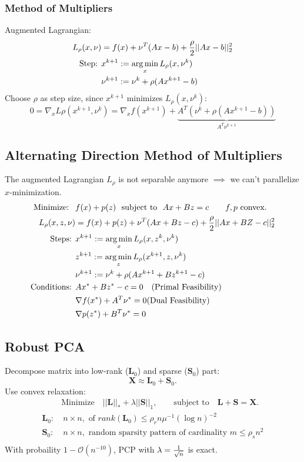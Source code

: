 \documentclass[a4paper,11pt,landscape]{article}
\newcommand{\argmin}{\operatorname*{arg\,min}}
\begin{document}
\begin{multicols}{3}
\subsubsection{Method of Multipliers}
Augmented Lagrangian:
\begin{align*}
  L_\rho (x,\nu) &= f(x) + \nu^T (Ax-b) + {\rho \over 2} ||Ax-b||_2^2\\
 \text{Step: }& x^{k+1} := \argmin_x L_\rho (x,\nu^k)\\
  &\nu^{k+1} := \nu^k +\rho (Ax^{k+1}-b)
\end{align*}
Choose $\rho$ as step size, since $x^{k+1}$ minimizes $L_\rho(x, \nu^k)$:
\[
 0 =\nabla_x L\rho(x^{k+1}, \nu^k) = \nabla_x f(x^{k+1}) + \underbrace{A^T (\nu^k +\rho(Ax^{k+1}-b))}_{A^T \nu^{k+1}}
\]

\subsection{Alternating Direction Method of Multipliers}
The augmented Lagrangian $L_\rho$ is not separable anymore $\implies$ we can't parallelize $x$-minimization.
\begin{align*}
 \text{Minimize: }\ &f(x) + p(z)\ \text{ subject to }\ Ax+Bz = c \qquad f,p \text{ convex}.\\
 L_\rho(x, z, \nu) &= f(x)+p(z)+ \nu^T (Ax+Bz-c) + {\rho \over 2}||Ax + BZ- c||_2^2\\
 \text{Steps: } & x^{k+1} := \argmin_x L_\rho (x, z^k, \nu^k)\\
  & z^{k+1} := \argmin_z L_\rho(x^{k+1}, z, \nu^k)\\
  & \nu^{k+1} := \nu^k + \rho(Ax^{k+1}+Bz^{k+1}-c)\\
 \text{Conditions: }& Ax^* + Bz^* - c = 0 \quad (\text{Primal Feasibility})\\
 &\nabla f(x^*) + A^T \nu^* = 0 (\text{Dual Feasibility})\\
 &\nabla p(z^*) + B^T \nu^* = 0
\end{align*}



\subsection{Robust PCA}
Decompose matrix into low-rank ($\mathbf L_0$) and sparse ($\mathbf S_0$) part:
\[
 \mathbf X \approx \mathbf L_0 + \mathbf S_0.
\]
Use convex relaxation:
\begin{align*}
 &\text{Minimize}\quad ||\mathbf L||_* + \lambda ||\mathbf S||_1, \qquad \text{subject to}\quad \mathbf L + \mathbf S = \mathbf X.\\
 \mathbf L_0:&\ n\times n, \text{ of } rank(\mathbf L_0)\leq \rho_r n \mu^{-1} (\log n)^{-2}\\
 \mathbf S_0:&\ n\times n, \text{ random sparsity pattern of cardinality }m \leq \rho_s n^2\\
\end{align*}
With probaility $1-\mathcal O(n^{-10})$, PCP with $\lambda = {1 \over \sqrt n}$ is exact.


\end{multicols}
\end{document}
